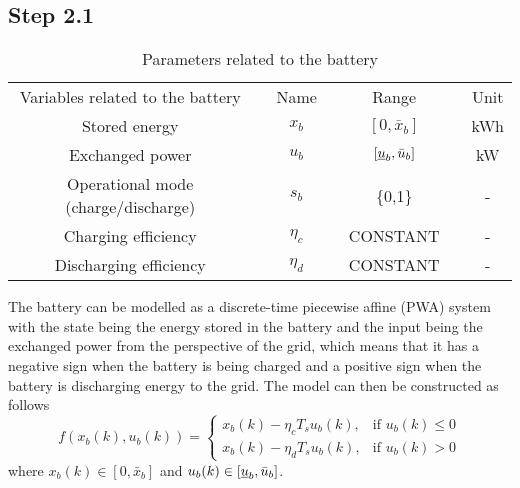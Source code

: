 \subsection*{Step 2.1}
\begin{table}[]
\centering
\begin{tabular}{clclclc}
Variables related to the battery &  & Name &  & Range &  & Unit \\ \cline{1-1} \cline{3-3} \cline{5-5} \cline{7-7} 
Stored energy &  & $x_b$ &  & $[0,\bar{x}_b]$ &  & kWh \\
Exchanged power &  & $u_b$ &  & $[\underbar{$u$}_b,\bar{u}_b]$ &  & kW \\
Operational mode (charge/discharge) &  & $s_b$ &  & \{0,1\} &  & - \\
Charging efficiency &  & $\eta_c$ &  & CONSTANT &  & - \\
Discharging efficiency &  & $\eta_d$ &  & CONSTANT &  & -
\end{tabular}
\caption{Parameters related to the battery}
\label{batteryParm}
\end{table}

The battery can be modelled as a discrete-time piecewise affine (PWA) system with the state being the energy stored in the battery and the input being the exchanged power from the perspective of the grid, which means that it has a negative sign when the battery is being charged and a positive sign when the battery is discharging energy to the grid. The model can then be constructed as follows
\begin{equation*}
f(x_b(k),u_b(k)) =\left\{\begin{matrix}
x_b(k)-\eta_c T_s u_b(k), & \text{if } u_b(k) \leq 0 \\
x_b(k)-\eta_d T_s u_b(k), & \text{if } u_b(k) > 0 
\end{matrix}\right.
\end{equation*}
where $x_b(k) \in [0,\bar{x}_b]$ and $u_b(k) \in [\underbar{$u$}_b, \bar{u}_b]$.
